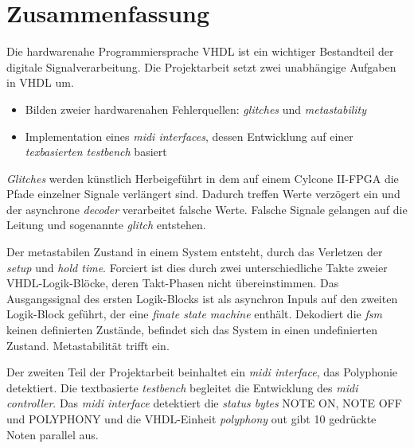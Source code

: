 
\chapter*{Zusammenfassung}


Die hardwarenahe Programmiersprache VHDL ist ein wichtiger Bestandteil der digitale Signalverarbeitung. Die Projektarbeit setzt zwei unabhängige Aufgaben in VHDL um.

\begin{itemize}
\item Bilden zweier hardwarenahen Fehlerquellen: \textit{glitches} und \textit{metastability}
	\item Implementation eines \textit{midi interfaces}, dessen Entwicklung auf einer \textit{texbasierten testbench} basiert
\end{itemize} 

 \textit{Glitches} werden künstlich Herbeigeführt in dem auf einem Cylcone II-FPGA die Pfade einzelner Signale verlängert sind. Dadurch treffen Werte verzögert ein und der asynchrone \textit{decoder} verarbeitet falsche Werte. Falsche Signale gelangen auf die Leitung und sogenannte \textit{glitch} entstehen. 

Der metastabilen Zustand in einem System entsteht, durch das Verletzen der \textit{setup} und \textit{hold time}. Forciert ist dies durch zwei unterschiedliche Takte zweier VHDL-Logik-Blöcke, deren Takt-Phasen nicht übereinstimmen. Das Ausgangssignal des ersten Logik-Blocks ist als asynchron Inpuls auf den zweiten Logik-Block geführt, der eine \textit{finate state machine} enthält. Dekodiert die \textit{fsm} keinen definierten Zustände, befindet sich das System in einen undefinierten Zustand. Metastabilität trifft ein.

Der zweiten Teil der Projektarbeit beinhaltet ein \textit{midi interface}, das Polyphonie detektiert. Die textbasierte \textit{testbench} begleitet die Entwicklung des \textit{midi controller}. Das \textit{midi interface} detektiert die \textit{status bytes} NOTE ON, NOTE OFF und POLYPHONY und die VHDL-Einheit \textit{polyphony} out gibt 10 gedrückte Noten parallel aus.
